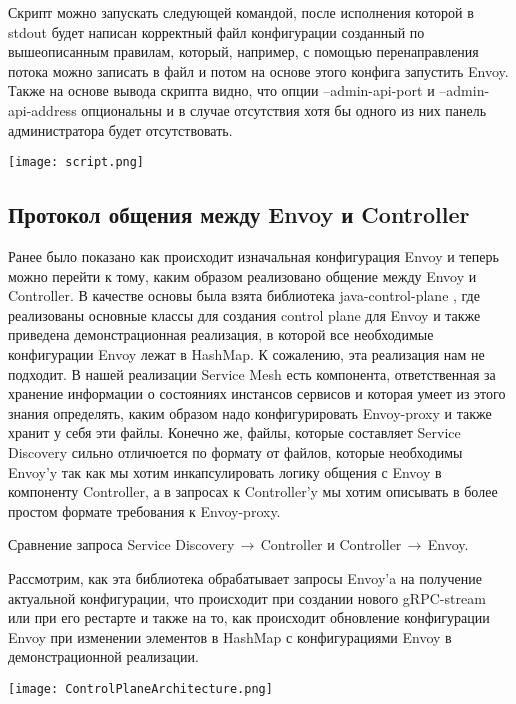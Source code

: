 Скрипт можно запускать следующей командой, после исполнения которой в stdout будет написан корректный файл конфигурации созданный по вышеописанным правилам, который, например, с помощью перенаправления потока можно записать в файл и потом на основе этого конфига запустить Envoy. Также на основе вывода скрипта видно, что опции --admin-api-port и --admin-api-address опциональны и в случае отсутствия хотя бы одного из них панель администратора будет отсутствовать.

\texttt{[image: script.png]}

\subsection{Протокол общения между Envoy и Controller}

Ранее было показано как происходит изначальная конфигурация Envoy и теперь можно перейти к тому, каким образом реализовано общение между Envoy и Controller. В качестве основы была взята библиотека java-control-plane \cite{EnvoyControlPlane}, где реализованы основные классы для создания control plane для Envoy и также приведена демонстрационная реализация, в которой все необходимые конфигурации Envoy лежат в HashMap. К сожалению, эта реализация нам не подходит. В нашей реализации Service Mesh есть компонента, ответственная за хранение информации о состояниях инстансов сервисов и которая умеет из этого знания определять, каким образом надо конфигурировать Envoy-proxy и также хранит у себя эти файлы. Конечно же, файлы, которые составляет Service Discovery сильно отличюется по формату от файлов, которые необходимы Envoy'y так как мы хотим инкапсулировать логику общения с Envoy в компоненту Controller, а в запросах к Controller'y мы хотим описывать в более простом формате требования к Envoy-proxy.

Сравнение запроса Service Discovery$\,\to\,$Controller и Controller$\,\to\,$Envoy.


Рассмотрим, как эта библиотека обрабатывает запросы Envoy'a на получение актуальной конфигурации, что происходит при создании нового gRPC-stream или при его рестарте и также на то, как происходит обновление конфигурации Envoy при изменении элементов в HashMap с конфигурациями Envoy в демонстрационной реализации.

\texttt{[image: ControlPlaneArchitecture.png]}

